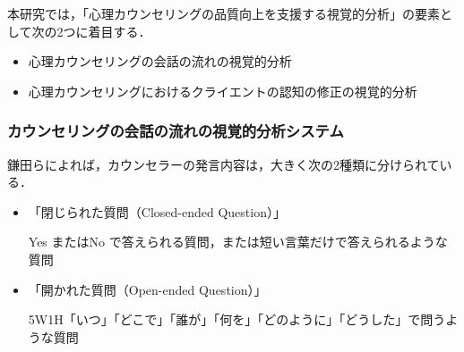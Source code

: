 \documentclass[shuuron]{kuee}
\begin{document}
%



本研究では，「心理カウンセリングの品質向上を支援する視覚的分析」の要素として次の2つに着目する．
\begin{itemize}
  \item %
  心理カウンセリングの会話の流れの視覚的分析%
  \item 心理カウンセリングにおけるクライエントの認知の修正の視覚的分析
\end{itemize}



\subsubsection{カウンセリングの会話の流れの視覚的分析システム}


鎌田ら\cite{Darshana}によれば，カウンセラーの発言内容は，大きく次の2種類に分けられている．%
\begin{itemize}
  \item 「閉じられた質問（Closed-ended Question）」

  Yes またはNo で答えられる質問，または短い言葉だけで答えられるような質問
  \item 「開かれた質問（Open-ended Question）」

  5W1H「いつ」「どこで」「誰が」「何を」「どのように」「どうした」で問うような質問

\end{itemize}
\end{document}
